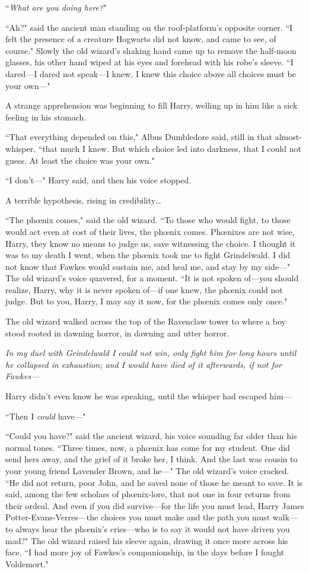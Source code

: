 ``\emph{What are you doing here?}"

``Ah?" said the ancient man standing on the roof-platform's opposite corner. ``I felt the presence of a creature Hogwarts did not know, and came to see, of course." Slowly the old wizard's shaking hand came up to remove the half-moon glasses, his other hand wiped at his eyes and forehead with his robe's sleeve. ``I dared---I dared not speak---I knew, I knew this choice above all choices must be your own---"

A strange apprehension was beginning to fill Harry, welling up in him like a sick feeling in his stomach.

``That everything depended on this," Albus Dumbledore said, still in that almost-whisper, ``that much I knew. But which choice led into darkness, that I could not guess. At least the choice was your own."

``I don't---" Harry said, and then his voice stopped.

A terrible hypothesis, rising in credibility{\ldots}

``The phœnix comes," said the old wizard. ``To those who would fight, to those would act even at cost of their lives, the phœnix comes. Phœnixes are not wise, Harry, they know no means to judge us, save witnessing the choice. I thought it was to my death I went, when the phœnix took me to fight Grindelwald. I did not know that Fawkes would sustain me, and heal me, and stay by my side---" The old wizard's voice quavered, for a moment. ``It is not spoken of---you should realize, Harry, why it is never spoken of---if one knew, the phœnix could not judge. But to you, Harry, I may say it now, for the phœnix comes only once."

The old wizard walked across the top of the Ravenclaw tower to where a boy stood rooted in dawning horror, in dawning and utter horror.

\emph{In my duel with Grindelwald I could not win, only fight him for long hours until he collapsed in exhaustion; and I would have died of it afterwards, if not for Fawkes---}

Harry didn't even know he was speaking, until the whisper had escaped him---

``Then I \emph{could} have---"

``Could you have?" said the ancient wizard, his voice sounding far older than his normal tones. ``Three times, now, a phœnix has come for my student. One did send hers away, and the grief of it broke her, I think. And the last was cousin to your young friend Lavender Brown, and he---" The old wizard's voice cracked. ``He did not return, poor John, and he saved none of those he meant to save. It is said, among the few scholars of phœnix-lore, that not one in four returns from their ordeal. And even if you did survive---for the life you must lead, Harry James Potter-Evans-Verres---the choices you must make and the path you must walk---to always hear the phœnix's cries---who is to say it would not have driven you mad?" The old wizard raised his sleeve again, drawing it once more across his face. ``I had more joy of Fawkes's companionship, in the days before I fought Voldemort."

